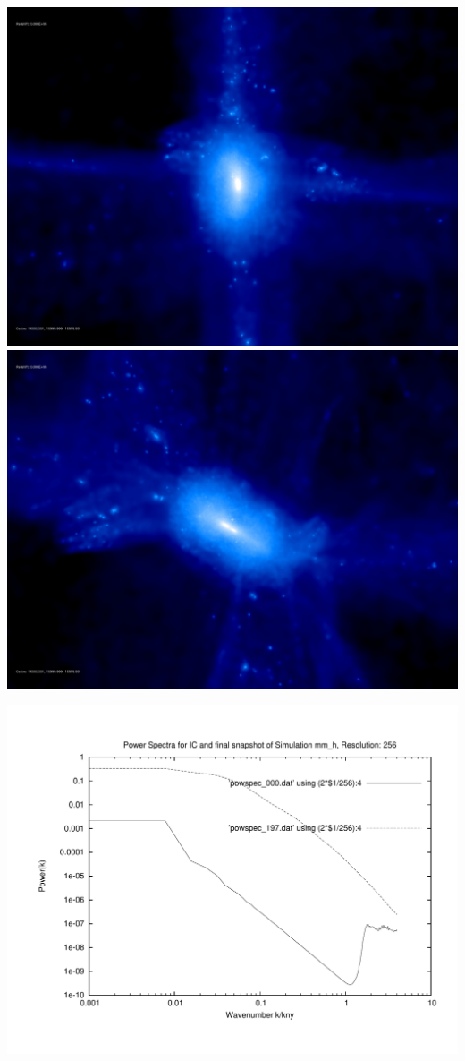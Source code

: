 \includegraphics[scale=0.1]{r256/h100/mm_h/rotate_00074.jpg} \\
\includegraphics[scale=0.15]{r256/h100/mm_h/rotate_00131.jpg} 

\includegraphics[scale=0.5]{r256/h100/mm_h/plot_powspec_mm_h.pdf}

